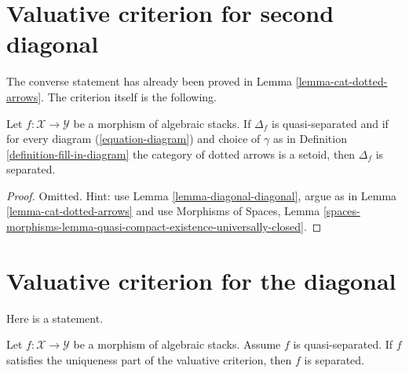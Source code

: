 \section{Valuative criterion for second diagonal}
\label{section-valuative-second}

\noindent
The converse statement has already been proved in
Lemma \ref{lemma-cat-dotted-arrows}.
The criterion itself is the following.

\begin{lemma}
\label{lemma-setoids-and-diagonal}
Let $f : \mathcal{X} \to \mathcal{Y}$ be a morphism of algebraic stacks.
If $\Delta_f$ is quasi-separated and if for every diagram
(\ref{equation-diagram}) and choice of $\gamma$ as in
Definition \ref{definition-fill-in-diagram}
the category of dotted arrows
is a setoid, then $\Delta_f$ is separated.
\end{lemma}

\begin{proof}
Omitted. Hint: use Lemma \ref{lemma-diagonal-diagonal}, argue as in
Lemma \ref{lemma-cat-dotted-arrows} and use
Morphisms of Spaces, Lemma
\ref{spaces-morphisms-lemma-quasi-compact-existence-universally-closed}.
\end{proof}






\section{Valuative criterion for the diagonal}
\label{section-valuative-diagonal}

\noindent
Here is a statement.

\begin{lemma}
\label{lemma-uniqueness-and-diagonal}
Let $f : \mathcal{X} \to \mathcal{Y}$ be a morphism of algebraic stacks.
Assume $f$ is quasi-separated.
If $f$ satisfies the uniqueness part of the valuative criterion,
then $f$ is separated.
\end{lemma}

